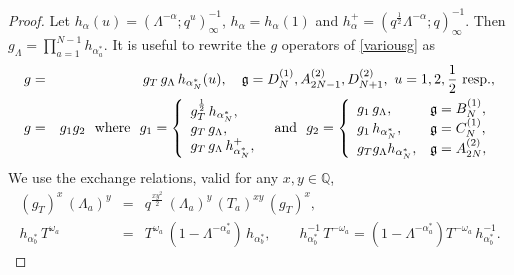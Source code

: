 \documentclass[12pt]{amsart}
\newcommand{\g}{{\mathfrak{g}}}
\newcommand{\al}{{\alpha}}
\newcommand{\lL}{{\Lambda}}
\newcommand{\half}{\frac{1}{2}}
\numberwithin{equation}{section}
\begin{document}
\begin{proof}
Let
$h_{\al}(u)=(\lL^{-\al};q^u)_\infty^{-1}$, $h_\al=h_\al(1)$ and $h_{\al}^+=(q^\half \lL^{-\al};q)_\infty^{-1}$.
Then $g_\lL=\prod_{a=1}^{N-1} h_{\al_a^*}$.
%
It is useful to rewrite the $g$ operators of \eqref{variousg} as
\begin{eqnarray*}
g&=& g_T\,g_\lL\,h_{\al_N^*}(u),\quad \g=D_N^{(1)},A_{2N-1}^{(2)},D_{N+1}^{(2)} , \ u=1,2,\half\ {\rm resp.},
\nonumber \\
%
g&=& g_1 g_2\ \hbox{ where }\ g_1=\left\{ \begin{array}{l} 
g_T^\half \,h_{\al_N^*},\\ %
g_T\,g_\lL,\\%
g_T \,g_\lL\, h_{\al_N^*}^+,\\%
\end{array}\right.\  \hbox{ and } \
g_2=\left\{ \begin{array}{ll} 
g_1\,g_\lL,& \g=B_N^{(1)},\\
g_1\, h_{\al_N^*}, &\g=C_N^{(1)},\\
g_T g_\lL h_{\al_N^*},& \g=A_{2N}^{(2)},
\end{array}\right.
\end{eqnarray*}
%
%
%
We use the exchange relations, valid for any $x,y\in\mathbb Q$,
\begin{eqnarray}
(g_T)^x \,(\lL_a)^y &=&q^{\frac{x y^2}{2}} \,(\lL_a)^y\, (T_a)^{xy}\, (g_T)^x , \label{gtexch}\\
h_{\al_b^*}\, T^{\omega_a}&=& T^{\omega_a}\,(1-\lL^{-\al_a^*})\, h_{\al_b^*},\qquad
h_{\al_b^*}^{-1}\, T^{-\omega_a}=(1-\lL^{-\al_a^*}) T^{-\omega_a}\,h_{\al_b^*}^{-1} .\label{hexch}
\end{eqnarray}

%
%
%
%
%
%
%
%


\end{proof}
\end{document}
